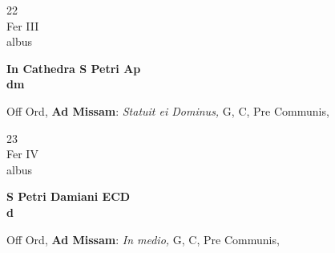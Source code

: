 \documentclass[10pt, openany]{book}
\begin{document}
        \begin{center}
            \begin{minipage}{3.5in}
                \vspace{2em}
                \begin{minipage}{0.5in}
                    {\Huge 22} \\
                    {\normalsize Fer III} \\
                    {\normalsize albus}
                \end{minipage}
                \begin{minipage}{3.0in}
                    \textbf{ \large In Cathedra S Petri Ap \\
                    \textnormal{\normalsize dm}} \\ 
                \end{minipage}
                \begin{justify}Off Ord, \textbf{Ad Missam}: \textit{Statuit ei Dominus,} G, C, Pre Communis,   
                \end{justify}
            \end{minipage}
        \end{center}
    
        \begin{center}
            \begin{minipage}{3.5in}
                \vspace{2em}
                \begin{minipage}{0.5in}
                    {\Huge 23} \\
                    {\normalsize Fer IV} \\
                    {\normalsize albus}
                \end{minipage}
                \begin{minipage}{3.0in}
                    \textbf{ \large S Petri Damiani ECD \\
                    \textnormal{\normalsize d}} \\ 
                \end{minipage}
                \begin{justify}Off Ord, \textbf{Ad Missam}: \textit{In medio,} G, C, Pre Communis,   
                \end{justify}
            \end{minipage}
        \end{center}
    
\end{document}
